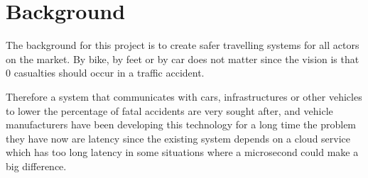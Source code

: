 \section{Background}
The background for this project is to create safer travelling systems for all actors on the market. By bike, by feet or by car does not matter since the vision is that 0 casualties should occur in a traffic accident.\bigskip

Therefore a system that communicates with cars, infrastructures or other vehicles to lower the percentage of fatal accidents are very sought after, and vehicle manufacturers have been developing this technology for a long time the problem they have now are latency since the existing system depends on a cloud service which has too long latency in some situations where a microsecond could make a big difference.